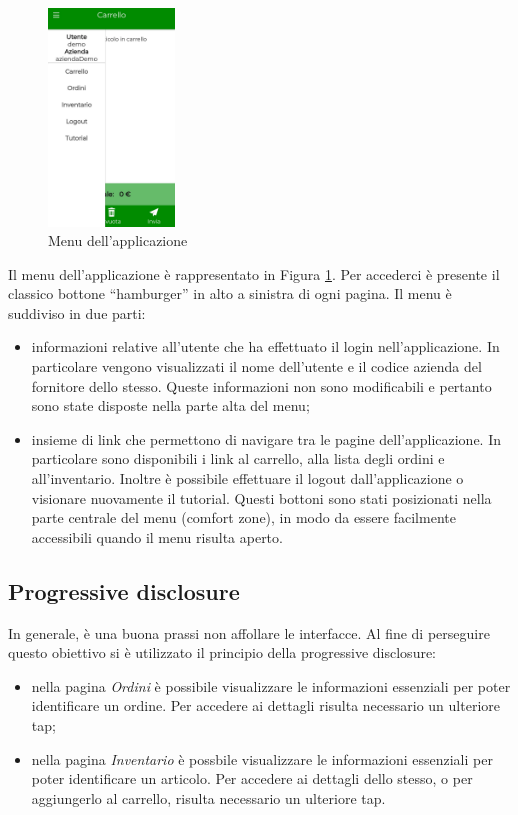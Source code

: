 \documentclass[12pt, a4paper, titlepage]{report}
\begin{document}
	\begin{figure}[H] 
		\centering
		\includegraphics[width=0.3\textwidth]{img/menu}
		\caption{Menu dell'applicazione}
		\label{fig:menu}
	\end{figure}
	Il menu dell'applicazione è rappresentato in Figura \ref{fig:menu}. Per accederci è presente il classico bottone ``hamburger'' in alto a sinistra di ogni pagina. Il menu è suddiviso in due parti: 
	\begin{itemize}
		\item informazioni relative all'utente che ha effettuato il login nell'applicazione. In particolare vengono visualizzati il nome dell'utente e il codice azienda del fornitore dello stesso. Queste informazioni non sono modificabili e pertanto sono state disposte nella parte alta del menu;
		\item insieme di link che permettono di navigare tra le pagine dell'applicazione. In particolare sono disponibili i link al carrello, alla lista degli ordini e all'inventario. Inoltre è possibile effettuare il logout dall'applicazione o visionare nuovamente il tutorial. Questi bottoni sono stati posizionati nella parte centrale del menu (comfort zone), in modo da essere facilmente accessibili quando il menu risulta aperto.
	\end{itemize}

	\subsection{Progressive disclosure}
	
	In generale, è una buona prassi non affollare le interfacce. Al fine di perseguire questo obiettivo si è utilizzato il principio della progressive disclosure:
	\begin{itemize}
		\item nella pagina \textit{Ordini} è possibile visualizzare le informazioni essenziali per poter identificare un ordine. Per accedere ai dettagli risulta necessario un ulteriore tap;
		\item nella pagina \textit{Inventario} è possbile visualizzare le informazioni essenziali per poter identificare un articolo. Per accedere ai dettagli dello stesso, o per aggiungerlo al carrello, risulta necessario un ulteriore tap.
	\end{itemize}
	
\end{document}
